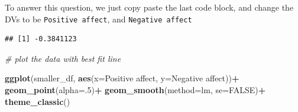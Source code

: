 \documentclass[
]{book}
\newenvironment{Shaded}{\begin{snugshade}}{\end{snugshade}}
\newcommand{\AttributeTok}[1]{\textcolor[rgb]{0.13,0.29,0.53}{#1}}
\newcommand{\CommentTok}[1]{\textcolor[rgb]{0.56,0.35,0.01}{\textit{#1}}}
\newcommand{\ConstantTok}[1]{\textcolor[rgb]{0.56,0.35,0.01}{#1}}
\newcommand{\DecValTok}[1]{\textcolor[rgb]{0.00,0.00,0.81}{#1}}
\newcommand{\FunctionTok}[1]{\textcolor[rgb]{0.13,0.29,0.53}{\textbf{#1}}}
\newcommand{\NormalTok}[1]{#1}
\newcommand{\OtherTok}[1]{\textcolor[rgb]{0.56,0.35,0.01}{#1}}
\newcommand{\SpecialCharTok}[1]{\textcolor[rgb]{0.81,0.36,0.00}{\textbf{#1}}}
\newcommand{\StringTok}[1]{\textcolor[rgb]{0.31,0.60,0.02}{#1}}
\begin{document}
To answer this question, we just copy paste the last code block, and change the DVs to be \texttt{Positive\ affect}, and \texttt{Negative\ affect}

\begin{Shaded}
\end{Shaded}

\begin{verbatim}
## [1] -0.3841123
\end{verbatim}

\begin{Shaded}
\begin{Highlighting}[]
\CommentTok{\# plot the data with best fit line}

\FunctionTok{ggplot}\NormalTok{(smaller\_df, }\FunctionTok{aes}\NormalTok{(}\AttributeTok{x=}\StringTok{\textasciigrave{}}\AttributeTok{Positive affect}\StringTok{\textasciigrave{}}\NormalTok{,}
                     \AttributeTok{y=}\StringTok{\textasciigrave{}}\AttributeTok{Negative affect}\StringTok{\textasciigrave{}}\NormalTok{))}\SpecialCharTok{+}
  \FunctionTok{geom\_point}\NormalTok{(}\AttributeTok{alpha=}\NormalTok{.}\DecValTok{5}\NormalTok{)}\SpecialCharTok{+}
  \FunctionTok{geom\_smooth}\NormalTok{(}\AttributeTok{method=}\NormalTok{lm, }\AttributeTok{se=}\ConstantTok{FALSE}\NormalTok{)}\SpecialCharTok{+}
  \FunctionTok{theme\_classic}\NormalTok{()}
\end{Highlighting}
\end{Shaded}
\end{document}
